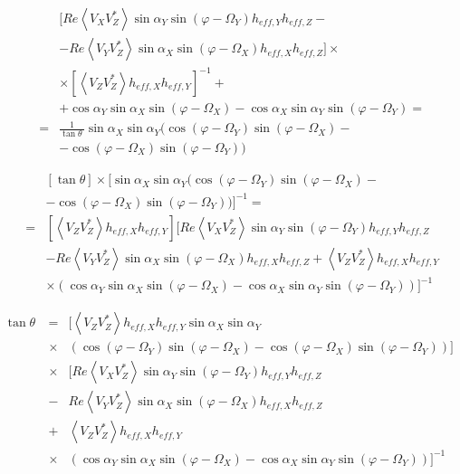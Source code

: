 \documentclass[a4paper,10pt]{thesis}
\begin{document}
\begin{eqnarray}
&&[Re \left\langle V_X V_Z^{*}\right\rangle \sin \alpha_Y  \sin (\varphi - \Omega_Y) h_{eff,Y}h_{eff,Z}-\nonumber \\
&&-Re\left\langle V_Y V_Z^{*}\right\rangle\sin \alpha_X  \sin (\varphi - \Omega_X) h_{eff,X}h_{eff,Z}]\times \nonumber \\
&&\times \left[ \left\langle V_Z V_Z^{*} \right\rangle h_{eff,X} h_{eff,Y}\right]^{-1}+\nonumber \\
&&+\cos \alpha_Y \sin \alpha_X  \sin (\varphi - \Omega_X)-\cos \alpha_X  \sin \alpha_Y  \sin (\varphi - \Omega_Y)=\nonumber \\
&=&  \frac{1}{\tan \theta\ } \sin \alpha_X  \sin \alpha_Y ( \cos (\varphi - \Omega_Y)  \sin (\varphi - \Omega_X) - \nonumber \\
&&-\cos (\varphi - \Omega_X)  \sin (\varphi - \Omega_Y))
\end{eqnarray}

\begin{eqnarray}
&&\left[ \tan \theta \right]  \times [ \sin \alpha_X  \sin \alpha_Y ( \cos (\varphi - \Omega_Y)  \sin (\varphi - \Omega_X)-\nonumber \\
&&-\cos (\varphi - \Omega_X)  \sin (\varphi - \Omega_Y))]^{-1} = \nonumber \\
&=& [\left\langle V_Z V_Z^{*} \right\rangle h_{eff,X} h_{eff,Y}]  [Re \left\langle V_X V_Z^{*}\right\rangle \sin \alpha_Y  \sin (\varphi - \Omega_Y) h_{eff,Y}h_{eff,Z}\nonumber \\
&&-Re\left\langle V_Y V_Z^{*}\right\rangle\sin \alpha_X  \sin (\varphi - \Omega_X) h_{eff,X}h_{eff,Z} +\left\langle V_Z V_Z^{*} \right\rangle h_{eff,X} h_{eff,Y} \nonumber \\
&&\times(\cos \alpha_Y \sin \alpha_X  \sin (\varphi - \Omega_X)-\cos \alpha_X  \sin \alpha_Y  \sin (\varphi - \Omega_Y))]^{-1}
\end{eqnarray}

\begin{eqnarray}\label{tan_theta}
\tan \theta\  &=&
[\left\langle V_Z V_Z^{*} \right\rangle h_{eff,X} h_{eff,Y} \sin \alpha_X  \sin \alpha_Y \\
&\times&( \cos (\varphi - \Omega_Y)  \sin (\varphi - \Omega_X) -\cos (\varphi - \Omega_X)  \sin (\varphi - \Omega_Y))]\nonumber \\
&\times& [Re \left\langle V_X V_Z^{*}\right\rangle \sin \alpha_Y  \sin (\varphi - \Omega_Y) h_{eff,Y}h_{eff,Z} \nonumber \\
&-&Re\left\langle V_Y V_Z^{*}\right\rangle\sin \alpha_X  \sin (\varphi - \Omega_X) h_{eff,X}h_{eff,Z}\nonumber \\
&+&\left\langle V_Z V_Z^{*} \right\rangle h_{eff,X} h_{eff,Y} \nonumber \\
&\times&(\cos \alpha_Y \sin \alpha_X  \sin (\varphi - \Omega_X)-\cos \alpha_X  \sin \alpha_Y  \sin (\varphi - \Omega_Y))]^{-1} \nonumber
\end{eqnarray}
\end{document}
